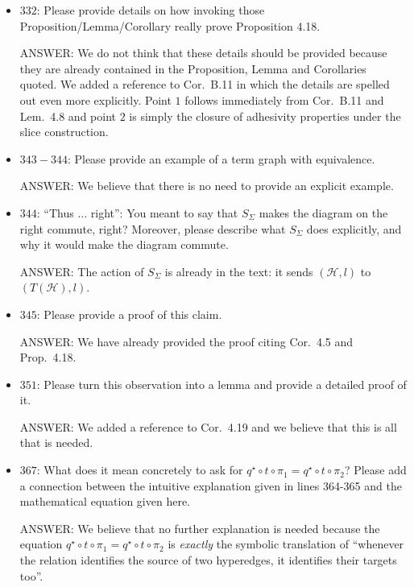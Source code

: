 \documentclass[english,11pt,a4paper]{article}
\begin{document}
\begin{itemize}
\item $332$: Please provide details on how invoking those Proposition/Lemma/Corollary really prove Proposition 4.18.

ANSWER: We do not think that these details should be provided because they are already contained in the  Proposition, Lemma and Corollaries quoted. We added a reference to Cor.~B.11 in which the details are spelled out even more explicitly.  Point $1$ follows immediately from Cor.~B.11 and Lem.~4.8 and point $2$ is simply the closure of adhesivity properties under the slice construction.


\item$343-344$: Please provide an example of a term graph with equivalence.

ANSWER: We believe that there is no need to provide an explicit example. %

\item $344$: ``Thus ... right'': You meant to say that $S_\Sigma$ makes the diagram on the right commute, right? Moreover, please describe what $S_\Sigma$ does explicitly, and why it would make the diagram commute.

ANSWER: The action of $S_\Sigma$ is already in the text: it sends $(\mathcal{H},l)$ to $(T(\mathcal{H}),l)$. 

\item $345$: Please provide a proof of this claim.

ANSWER: We have already provided the proof citing Cor.~4.5 and Prop.~4.18.

\item $351$: Please turn this observation into a lemma and provide a detailed proof of it.

ANSWER: We added a reference to Cor.~4.19  and we believe that this is all that is needed. 

\item $367$: What does it mean concretely to ask for $q^\star \circ t\circ \pi_1= q^\star \circ t \circ \pi_2$? Please add a connection between the intuitive explanation given in lines 364-365 and the mathematical equation given here. 

ANSWER: We believe that no further explanation is needed because the equation $q^\star \circ t\circ \pi_1= q^\star \circ t \circ \pi_2$ is \emph{exactly} the symbolic translation of ``whenever the relation identifies the source of two hyperedges, it identifies their targets too''.


\end{itemize}
\end{document}
